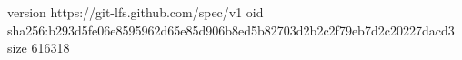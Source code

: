 version https://git-lfs.github.com/spec/v1
oid sha256:b293d5fe06e8595962d65e85d906b8ed5b82703d2b2c2f79eb7d2c20227dacd3
size 616318
